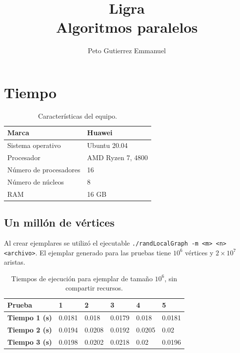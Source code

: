 \documentclass{article}
\title{Ligra\\Algoritmos paralelos}
\author{Peto Gutierrez Emmanuel}
\begin{document}
\maketitle

\section{Tiempo}

\begin{table}[htbp]
\begin{center}
\begin{tabular}{|l|l|}
\hline
Marca & Huawei \\ \hline
Sistema operativo & Ubuntu 20.04 \\ \hline
Procesador & AMD Ryzen 7, 4800 \\ \hline
Número de procesadores & 16 \\ \hline
Número de núcleos & 8 \\ \hline
RAM & 16 GB \\ \hline

\end{tabular}
\caption{Características del equipo.} \label{table:1}
\end{center}
\end{table}

\subsection{Un millón de vértices}

Al crear ejemplares se utilizó el ejecutable \texttt{./randLocalGraph -m <m> <n> <archivo>}. El ejemplar generado para las pruebas tiene $10^6$ vértices y $2 \times 10 ^7$ aristas.

\begin{table}[htbp]
\begin{center}
\begin{tabular}{|l|l|l|l|l|l|}
\hline
\textbf{Prueba} & \textbf{1} & \textbf{2} & \textbf{3} & \textbf{4} & \textbf{5} \\ \hline
\textbf{Tiempo 1 (s)} & 0.0181 & 0.018 & 0.0179 & 0.018 & 0.0181 \\ \hline
\textbf{Tiempo 2 (s)} & 0.0194 & 0.0208 & 0.0192 & 0.0205 & 0.02 \\ \hline
\textbf{Tiempo 3 (s)} & 0.0198 & 0.0202 & 0.0218 & 0.02 & 0.0196 \\ \hline


\end{tabular}
\caption{Tiempos de ejecución para ejemplar de tamaño $10^6$, sin compartir recursos.} \label{table:2}
\end{center}
\end{table}
\end{document}
